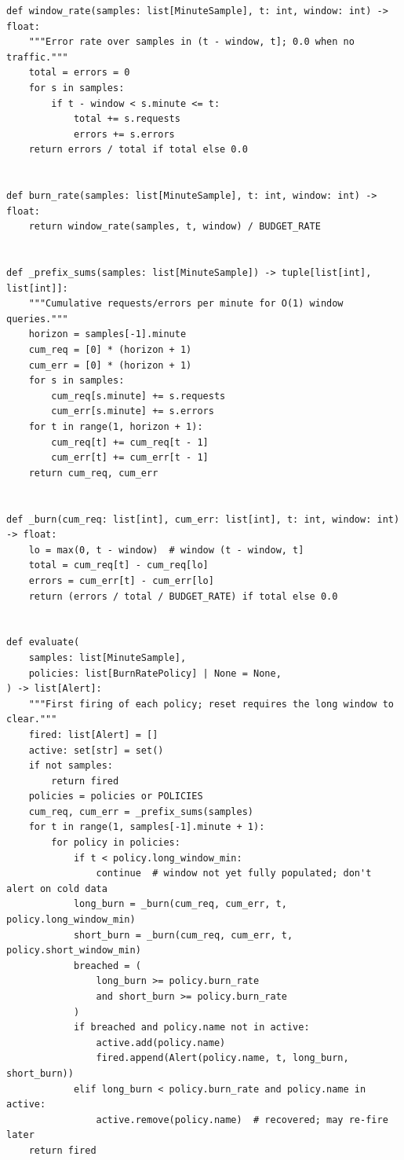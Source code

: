 \begin{verbatim}
def window_rate(samples: list[MinuteSample], t: int, window: int) -> float:
    """Error rate over samples in (t - window, t]; 0.0 when no traffic."""
    total = errors = 0
    for s in samples:
        if t - window < s.minute <= t:
            total += s.requests
            errors += s.errors
    return errors / total if total else 0.0


def burn_rate(samples: list[MinuteSample], t: int, window: int) -> float:
    return window_rate(samples, t, window) / BUDGET_RATE


def _prefix_sums(samples: list[MinuteSample]) -> tuple[list[int], list[int]]:
    """Cumulative requests/errors per minute for O(1) window queries."""
    horizon = samples[-1].minute
    cum_req = [0] * (horizon + 1)
    cum_err = [0] * (horizon + 1)
    for s in samples:
        cum_req[s.minute] += s.requests
        cum_err[s.minute] += s.errors
    for t in range(1, horizon + 1):
        cum_req[t] += cum_req[t - 1]
        cum_err[t] += cum_err[t - 1]
    return cum_req, cum_err


def _burn(cum_req: list[int], cum_err: list[int], t: int, window: int) -> float:
    lo = max(0, t - window)  # window (t - window, t]
    total = cum_req[t] - cum_req[lo]
    errors = cum_err[t] - cum_err[lo]
    return (errors / total / BUDGET_RATE) if total else 0.0


def evaluate(
    samples: list[MinuteSample],
    policies: list[BurnRatePolicy] | None = None,
) -> list[Alert]:
    """First firing of each policy; reset requires the long window to clear."""
    fired: list[Alert] = []
    active: set[str] = set()
    if not samples:
        return fired
    policies = policies or POLICIES
    cum_req, cum_err = _prefix_sums(samples)
    for t in range(1, samples[-1].minute + 1):
        for policy in policies:
            if t < policy.long_window_min:
                continue  # window not yet fully populated; don't alert on cold data
            long_burn = _burn(cum_req, cum_err, t, policy.long_window_min)
            short_burn = _burn(cum_req, cum_err, t, policy.short_window_min)
            breached = (
                long_burn >= policy.burn_rate
                and short_burn >= policy.burn_rate
            )
            if breached and policy.name not in active:
                active.add(policy.name)
                fired.append(Alert(policy.name, t, long_burn, short_burn))
            elif long_burn < policy.burn_rate and policy.name in active:
                active.remove(policy.name)  # recovered; may re-fire later
    return fired



\end{verbatim}
